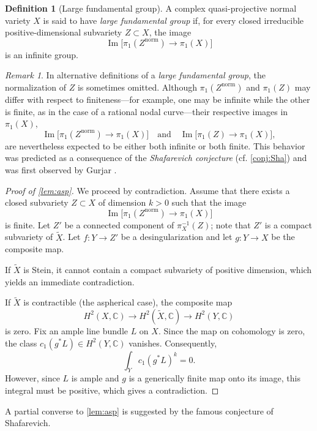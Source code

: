 \documentclass[english]{amsproc}
\theoremstyle{plain}
\theoremstyle{definition}
\newtheorem{dfn}[thm]{Definition}
\theoremstyle{remark}
\newtheorem{rem}[thm]{Remark}
\theoremstyle{plain}
\numberwithin{equation}{thm} %
\begin{document}
	\begin{dfn}[Large fundamental group]\label{def:large}
		A complex quasi-projective normal variety $X$ is said to have \emph{large fundamental group} if, for every closed irreducible positive-dimensional subvariety $Z \subset X$, the image
		\[
		\operatorname{Im}\bigl[\pi_1(Z^{\mathrm{norm}}) \longrightarrow \pi_1(X)\bigr]
		\]
		is an infinite group.
	\end{dfn}
	\begin{rem}
		In alternative definitions of a \emph{large fundamental group}, the normalization of $Z$ is sometimes omitted. Although $\pi_1(Z^{\mathrm{norm}})$ and $\pi_1(Z)$ may differ with respect to finiteness---for example, one may be infinite while the other is finite, as in the case of a rational nodal curve---their respective images in $\pi_1(X)$,
		\[
		\operatorname{Im}\bigl[\pi_1(Z^{\mathrm{norm}})\longrightarrow \pi_1(X)\bigr]
		\quad\text{and}\quad
		\operatorname{Im}\bigl[\pi_1(Z)\longrightarrow \pi_1(X)\bigr],
		\]
		are nevertheless expected to be either both infinite or both finite. This behavior was predicted as a consequence of the \emph{Shafarevich conjecture} (cf.  \cref{conj:Sha}) and was first observed by Gurjar \cite{Gur85}. 
	\end{rem}
	\begin{proof}[Proof of \cref{lem:asp}]
		We proceed by contradiction. Assume that there exists a closed subvariety $Z \subset X$ of dimension $k > 0$ such that the image
		\[
		\operatorname{Im}\bigl[\pi_1(Z^{\mathrm{norm}}) \longrightarrow \pi_1(X)\bigr]
		\]
		is finite. Let $Z'$ be a connected component of $\pi_X^{-1}(Z)$; note that $Z'$ is a compact subvariety of $\widetilde{X}$. Let $f \colon Y \to Z'$ be a desingularization and let $g \colon Y \to X$ be the composite map. 
		
		If $\widetilde{X}$ is Stein, it cannot contain a compact subvariety of positive dimension, which yields an immediate contradiction. 
		
		If $\widetilde{X}$ is contractible (the aspherical case), the composite map
		\[
		H^{2}(X, \mathbb{C}) \longrightarrow H^2(\widetilde{X}, \mathbb{C}) \longrightarrow H^{2}(Y, \mathbb{C})
		\]
		is zero. Fix an ample line bundle $L$ on $X$. Since the map on cohomology is zero, the class $c_1(g^*L) \in H^2(Y, \mathbb{C})$ vanishes. Consequently,
		\[
		\int_{Y} c_1(g^*L)^{k} = 0.
		\]
		However, since $L$ is ample and $g$ is a generically finite map onto its image, this integral must be positive, which gives a contradiction.
	\end{proof}A partial converse to \cref{lem:asp} is suggested by the famous conjecture of Shafarevich.
\end{document}
